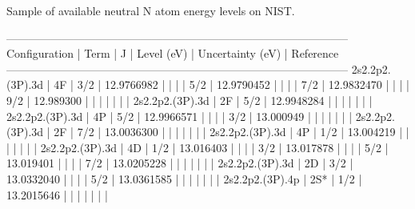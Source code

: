 \documentclass[12pt]{article}
\begin{document}
\begin{table}
		\caption{Sample of available neutral N atom energy levels on NIST.\cite{NIST_ASD}}
		\begin{verbbox}
--------------------------------------------------------------------------------------------
Configuration      | Term   |    J |            Level (eV) |   Uncertainty (eV) | Reference
--------------------------------------------------------------------------------------------
2s2.2p2.(3P).3d    | 4F     |  3/2 |          12.9766982   |                    |          
                   |        |  5/2 |          12.9790452   |                    |          
                   |        |  7/2 |          12.9832470   |                    |          
                   |        |  9/2 |          12.989300    |                    |          
                   |        |      |                       |                    |           
2s2.2p2.(3P).3d    | 2F     |  5/2 |          12.9948284   |                    |          
                   |        |      |                       |                    |           
2s2.2p2.(3P).3d    | 4P     |  5/2 |          12.9966571   |                    |          
                   |        |  3/2 |          13.000949    |                    |          
                   |        |      |                       |                    |           
2s2.2p2.(3P).3d    | 2F     |  7/2 |          13.0036300   |                    |          
                   |        |      |                       |                    |           
2s2.2p2.(3P).3d    | 4P     |  1/2 |          13.004219    |                    |          
                   |        |      |                       |                    |           
2s2.2p2.(3P).3d    | 4D     |  1/2 |          13.016403    |                    |          
                   |        |  3/2 |          13.017878    |                    |          
                   |        |  5/2 |          13.019401    |                    |          
                   |        |  7/2 |          13.0205228   |                    |          
                   |        |      |                       |                    |           
2s2.2p2.(3P).3d    | 2D     |  3/2 |          13.0332040   |                    |          
                   |        |  5/2 |          13.0361585   |                    |          
                   |        |      |                       |                    |           
2s2.2p2.(3P).4p    | 2S*    |  1/2 |          13.2015646   |                    |          
                   |        |      |                       |                    |           

\end{verbbox}
\end{table}
\end{document}
